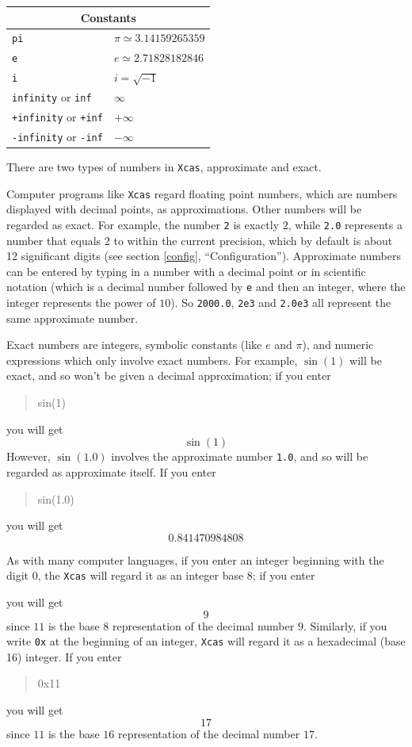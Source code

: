 \documentclass{article}
\newcommand{\xcasin}[1]
{\begin{quote}\ttfamily
#1
\end{quote}}
\newcommand{\xcasout}[1]
{\begin{equation*}
#1
\end{equation*}}
\begin{document}
\begin{center}
\begin{tabular}{|p{}|p{}|}
\hline
\multicolumn{2}{|c|}{\textbf{Constants}}\\
\hline\hline
\texttt{pi}  & $\pi\simeq 3.14159265359$ \\
\texttt{e}   & $e \simeq 2.71828182846$  \\
\texttt{i}   & $i=\sqrt{-1}$  \\
\texttt{infinity} or \texttt{inf}   & $\infty$  \\
\texttt{+infinity} or \texttt{+inf} & $+\infty$  \\
\texttt{-infinity} or \texttt{-inf} & $-\infty$  \\
\hline
\end{tabular}
\end{center}


There are two types of numbers in \texttt{Xcas}, approximate and exact.

Computer programs like \texttt{Xcas} regard floating point numbers,
which are numbers displayed with decimal points, as 
approximations.  Other
numbers will be regarded as exact.  For example, the number
\texttt{2} is exactly $2$, while \texttt{2.0} represents a number that
equals 2 to within the current precision, which by default is about 12
significant digits (see section \ref{config}, ``Configuration'').
Approximate numbers can be entered by
typing in a number with a decimal point or in scientific notation
(which is a decimal number followed by \texttt{e} and then an integer,
where the integer represents the power of $10$).  So \texttt{2000.0},
\texttt{2e3} and \texttt{2.0e3} all represent the same approximate
number.

Exact numbers are integers, symbolic constants (like $e$ and $\pi$),
and numeric expressions which only involve exact 
numbers. For example,
$\sin(1)$ will be exact, and so won't be given a decimal
approximation; if you enter
\xcasin{sin(1)}
you will get
\xcasout{\sin(1)}
However, $\sin(1.0)$ involves the approximate number \texttt{1.0}, and
so will be regarded as approximate itself.  If you enter
\xcasin{sin(1.0)}
you will get
\xcasout{0.841470984808}

As with many computer languages, if you enter an integer beginning
with the digit $0$, the \texttt{Xcas} will regard it as an integer
base 8; if you enter
\xcasin{011}
you will get
\xcasout{9}
since $11$ is the base $8$ representation of the decimal number $9$.
Similarly, if you write \texttt{0x} at the beginning of an integer,
\texttt{Xcas} will regard it as a hexadecimal (base 16) 
integer.  If you enter
\xcasin{0x11}
you will get
\xcasout{17}
since $11$ is the base $16$ representation of the decimal number $17$.
\end{document}
